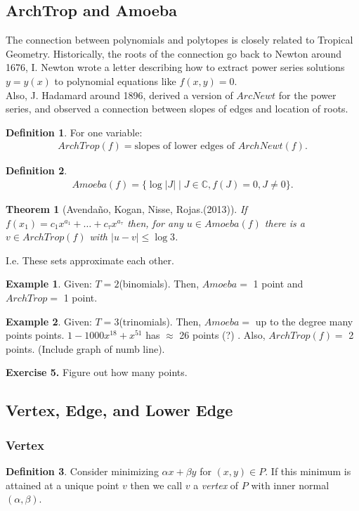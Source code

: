 \documentclass[]{article}
\newtheorem*{theorem}{Theorem}
\theoremstyle{definition}
\newtheorem*{defn}{Definition}
\newtheorem{ex}{Example}[section]
\begin{document}
			\subsection{ArchTrop and Amoeba}
			The connection between polynomials and polytopes is closely related to Tropical Geometry. Historically, the roots of the connection go back to Newton around 1676, I. Newton wrote a letter describing how to extract power series solutions $y=y(x)$ to polynomial equations like $f(x,y)=0$.\\
			Also, J. Hadamard around 1896, derived a version of $ArcNewt$ for the power series, and observed a connection between slopes of edges and location of roots.
			\begin{defn} For one variable:
			\begin{align*}
			ArchTrop(f)= \text{slopes of lower edges of $ArchNewt(f)$}.
			\end{align*}
			\end{defn}
						\begin{defn}
			\begin{align*}
			Amoeba(f)= \{\log|J| \mid J \in \mathbb{C}, f(J)=0, J\neq 0\}.
			\end{align*}
			\end{defn}
			\begin{theorem}[Avenda\~{n}o, Kogan, Nisse, Rojas.(2013)] If $f(x_1)=c_1x^{a_1}+\dots+c_\tau x^{a_\tau}$ then, for any $u \in Amoeba(f)$ there is a $v\in ArchTrop(f)$ with $|u-v| \leq \log 3$.
			\end{theorem}
			 I.e. These sets approximate each other.
			\begin{ex} Given: $T=2$(binomials). Then, $Amoeba = $ 1 point and $ArchTrop=$ 1 point.
			\end{ex}
			\begin{ex} Given: $T=3$(trinomials). Then, $Amoeba = $ up to the degree many points points. $1-1000x^{18}+x^{51}$ has $\approx$ 26 points (?) . Also, $ArchTrop(f)=$ 2 points. (Include graph of numb line).
			\end{ex}
			\textbf{Exercise 5.} Figure out how many points.\\
			\subsection{Vertex, Edge, and Lower Edge}
			\subsubsection{Vertex}
			\begin{defn}
			Consider minimizing $\alpha x+\beta y$ for $(x,y)\in P.$ If this minimum is attained at a unique point $v$ then we call $v$ a \emph{vertex} of $P$ with inner normal $(\alpha,\beta)$.
			\end{defn}
\end{document}
